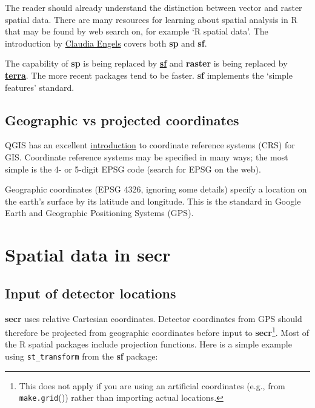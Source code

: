 \documentclass[
]{book}
\begin{document}
The reader should already understand the distinction between vector and raster spatial data. There are many resources for learning about spatial analysis in R that may be found by web search on, for example `R spatial data'. The introduction by \href{https://cengel.github.io/R-spatial/}{Claudia Engels} covers both \textbf{sp} and \textbf{sf}.

The capability of \textbf{sp} is being replaced by \href{https://r-spatial.github.io/sf/articles/}{\textbf{sf}} and \textbf{raster} is being replaced by \href{https://rspatial.org/terra/pkg/1-introduction.html}{\textbf{terra}}. The more recent packages tend to be faster. \textbf{sf} implements the `simple features' standard.

\subsection{Geographic vs projected coordinates}\label{geographic-vs-projected-coordinates}

QGIS has an excellent \href{https://docs.qgis.org/3.16/en/docs/gentle_gis_introduction/coordinate_reference_systems.html}{introduction} to coordinate reference systems (CRS) for GIS. Coordinate reference systems may be specified in many ways; the most simple is the 4- or 5-digit EPSG code (search for EPSG on the web).

Geographic coordinates (EPSG 4326, ignoring some details) specify a location on the earth's surface by its latitude and longitude. This is the standard in Google Earth and Geographic Positioning Systems (GPS).

\section{\texorpdfstring{Spatial data in \textbf{secr}}{Spatial data in secr}}\label{spatial-data-in-secr}

\subsection{Input of detector locations}\label{input-of-detector-locations}

\textbf{secr} uses relative Cartesian coordinates. Detector coordinates from GPS should therefore be projected from geographic coordinates before input to \textbf{secr}\footnote{This does not apply if you are using an artificial coordinates (e.g., from \texttt{make.grid}()) rather than importing actual locations.}. Most of the R spatial packages include projection functions. Here is a simple example using \texttt{st\_transform} from the \textbf{sf} package:
\end{document}
